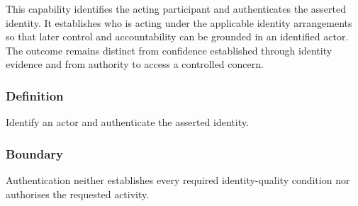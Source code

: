This capability identifies the acting participant and authenticates the asserted identity. It establishes who is acting under the applicable identity arrangements so that later control and accountability can be grounded in an identified actor. The outcome remains distinct from confidence established through identity evidence and from authority to access a controlled concern.

\subsubsection*{Definition}

Identify an actor and authenticate the asserted identity.

\subsubsection*{Boundary}

Authentication neither establishes every required identity-quality condition nor authorises the requested activity.


